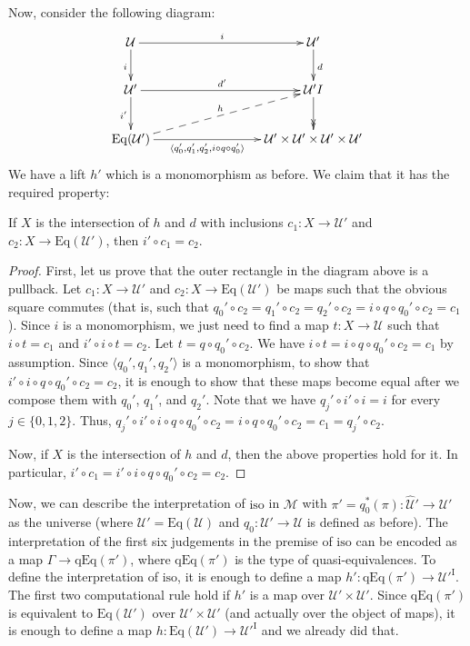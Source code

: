 \documentclass{amsart}
\theoremstyle{definition}
\theoremstyle{remark}
\newcommand{\fs}[1]{\mathrm{#1}}
\newcommand{\I}{\fs{I}}
\newcommand{\iso}{\fs{iso}}
\newcommand{\U}{\mathcal{U}}
\newcommand{\hU}{\widehat{\mathcal{U}}}
\newcommand{\Eq}{\fs{Eq}}
\newcommand{\qEq}{\fs{qEq}}
\numberwithin{figure}{section}
\begin{document}
Now, consider the following diagram:
\[ \xymatrix{ \U \ar[rrr]^i \ar[d]_i                                                                        & & & \U' \ar[d]^d \\
              \U' \ar[rrr]^{d'} \ar[d]_{i'}                                                                 & & & \U'^\I \ar@{->>}[d] \\
              \Eq(\U') \ar[rrr]_-{\langle q_0', q_1', q_2', i \circ q \circ q_0' \rangle} \ar@{-->}[urrr]^h & & & \U' \times \U' \times \U' \times \U'
            } \]
We have a lift $h'$ which is a monomorphism as before.
We claim that it has the required property:

\begin{lem}[intersection]
If $X$ is the intersection of $h$ and $d$ with inclusions $c_1 : X \to \U'$ and $c_2 : X \to \Eq(\U')$, then $i' \circ c_1 = c_2$.
\end{lem}
\begin{proof}
First, let us prove that the outer rectangle in the diagram above is a pullback.
Let $c_1 : X \to \U'$ and $c_2 : X \to \Eq(\U')$ be maps such that the obvious square commutes (that is, such that $q_0' \circ c_2 = q_1' \circ c_2 = q_2' \circ c_2 = i \circ q \circ q_0' \circ c_2 = c_1$).
Since $i$ is a monomorphism, we just need to find a map $t : X \to \U$ such that $i \circ t = c_1$ and $i' \circ i \circ t = c_2$.
Let $t = q \circ q_0' \circ c_2$.
We have $i \circ t = i \circ q \circ q_0' \circ c_2 = c_1$ by assumption.
Since $\langle q_0', q_1', q_2' \rangle$ is a monomorphism, to show that $i' \circ i \circ q \circ q_0' \circ c_2 = c_2$, it is enough to show that these maps become equal after we compose them with $q_0'$, $q_1'$, and $q_2'$.
Note that we have $q_j' \circ i' \circ i = i$ for every $j \in \{ 0, 1, 2 \}$.
Thus, $q_j' \circ i' \circ i \circ q \circ q_0' \circ c_2 = i \circ q \circ q_0' \circ c_2 = c_1 = q_j' \circ c_2$.

Now, if $X$ is the intersection of $h$ and $d$, then the above properties hold for it.
In particular, $i' \circ c_1 = i' \circ i \circ q \circ q_0' \circ c_2 = c_2$.
\end{proof}

Now, we can describe the interpretation of $\iso$ in $\mathcal{M}$ with $\pi' = q_0^*(\pi) : \hU' \to \U'$ as the universe (where $\U' = \Eq(\U)$ and $q_0 : \U' \to \U$ is defined as before).
The interpretation of the first six judgements in the premise of $\iso$ can be encoded as a map $\Gamma \to \qEq(\pi')$, where $\qEq(\pi')$ is the type of quasi-equivalences.
To define the interpretation of $\iso$, it is enough to define a map $h' : \qEq(\pi') \to \U'^\I$.
The first two computational rule hold if $h'$ is a map over $\U' \times \U'$.
Since $\qEq(\pi')$ is equivalent to $\Eq(\U')$ over $\U' \times \U'$ (and actually over the object of maps), it is enough to define a map $h : \Eq(\U') \to \U'^\I$ and we already did that.
\end{document}
